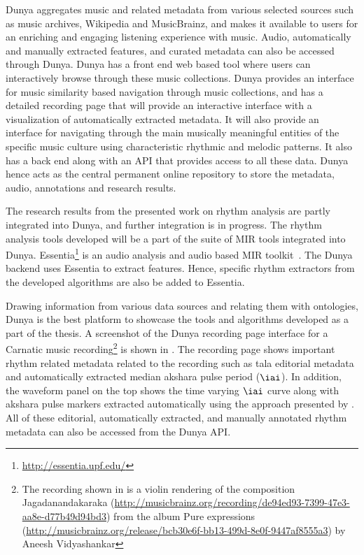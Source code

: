 Dunya aggregates music and related metadata from various selected sources such as music archives, Wikipedia and MusicBrainz, and makes it available to users for an enriching and engaging listening experience with music. Audio, automatically and manually extracted features, and curated metadata can also be accessed through Dunya. Dunya has a front end web based tool where users can interactively browse through these music collections. Dunya provides an interface for music similarity based navigation through music collections, and has a detailed recording page that will provide an interactive interface with a visualization of automatically extracted metadata. It will also provide an interface for navigating through the main musically meaningful entities of the specific music culture using characteristic rhythmic and melodic patterns. It also has a back end along with an API that provides access to all these data. Dunya hence acts as the central permanent online repository to store the metadata, audio, annotations and research results. 

The research results from the presented work on rhythm analysis are partly integrated into Dunya, and further integration is in progress. The rhythm analysis tools developed will be a part of the suite of \gls{MIR} tools integrated into Dunya. Essentia\footnote{\url{http://essentia.upf.edu/}} is an audio analysis and audio based \gls{MIR} toolkit~\cite{bogdanov:13:essentiaISMIR,bogdanov:13:essentiaACM}. The Dunya backend uses Essentia to extract features. Hence, specific rhythm extractors from the developed algorithms are also be added to Essentia. 

Drawing information from various data sources and relating them with ontologies, Dunya is the best platform to showcase the tools and algorithms developed as a part of the thesis. A screenshot of the Dunya recording page interface for a Carnatic music recording\footnote{The recording shown in  is a violin rendering of the composition Jagadanandakaraka (\url{http://musicbrainz.org/recording/de94ed93-7399-47e3-aa8e-d77b49d94bd3}) from the album Pure expressions (\url{http://musicbrainz.org/release/bcb30e6f-bb13-499d-8e0f-9447af8555a3}) by Aneesh Vidyashankar} is shown in . The recording page shows important rhythm related metadata related to the recording such as \gls{tala} editorial metadata and automatically extracted median \gls{akshara} pulse period ($\iai$). In addition, the waveform panel on the top shows the time varying $\iai$ curve along with \gls{akshara} pulse markers extracted automatically using the approach presented by . All of these editorial, automatically extracted, and manually annotated rhythm metadata can also be accessed from the Dunya API. 
% 
